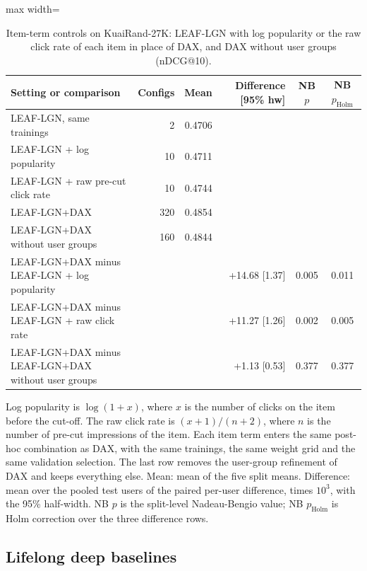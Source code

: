 \documentclass[preprint,12pt,authoryear]{elsarticle}
\begin{document}
\begin{table}[tbp]
\centering
\footnotesize
\caption{Item-term controls on KuaiRand-27K: LEAF-LGN with log popularity or the raw click rate of each item in place of DAX, and DAX without user groups (nDCG@10).}
\label{tab:item}
\begin{adjustbox}{max width=\linewidth}
\begin{tabular}{lrrrcc}
\toprule
Setting or comparison & Configs & Mean & Difference [95\% hw] & NB $p$ & NB $p_{\mathrm{Holm}}$ \\
\midrule
LEAF-LGN, same trainings & 2 & 0.4706 &  &  &  \\
LEAF-LGN + log popularity & 10 & 0.4711 &  &  &  \\
LEAF-LGN + raw pre-cut click rate & 10 & 0.4744 &  &  &  \\
\midrule
LEAF-LGN+DAX & 320 & 0.4854 &  &  &  \\
LEAF-LGN+DAX without user groups & 160 & 0.4844 &  &  &  \\
\midrule
LEAF-LGN+DAX minus LEAF-LGN + log popularity &  &  & +14.68 [1.37] & 0.005 & 0.011 \\
LEAF-LGN+DAX minus LEAF-LGN + raw click rate &  &  & +11.27 [1.26] & 0.002 & 0.005 \\
LEAF-LGN+DAX minus LEAF-LGN+DAX without user groups &  &  & +1.13 [0.53] & 0.377 & 0.377 \\
\bottomrule
\end{tabular}
\end{adjustbox}
\par\smallskip
\begin{minipage}{\linewidth}\raggedright\footnotesize Log popularity is $\log(1+x)$, where $x$ is the number of clicks on the item before the cut-off. The raw click rate is $(x+1)/(n+2)$, where $n$ is the number of pre-cut impressions of the item. Each item term enters the same post-hoc combination as DAX, with the same trainings, the same weight grid and the same validation selection. The last row removes the user-group refinement of DAX and keeps everything else. Mean: mean of the five split means. Difference: mean over the pooled test users of the paired per-user difference, times $10^{3}$, with the 95\% half-width. NB $p$ is the split-level Nadeau-Bengio value; NB $p_{\mathrm{Holm}}$ is Holm correction over the three difference rows.\end{minipage}
\end{table}


\subsection{Lifelong deep baselines}
\label{sec:res-deep}
\end{document}
